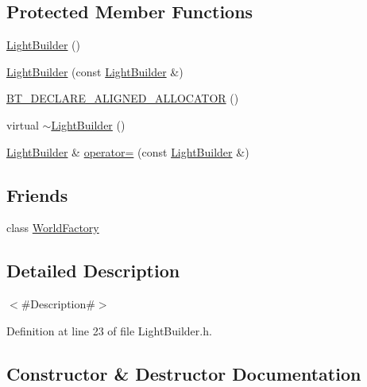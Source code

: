 \subsection*{Protected Member Functions}
\begin{DoxyCompactItemize}
\item 
\mbox{\hyperlink{classnjli_1_1_light_builder_a22fba014290a67469f193aa3ceb70f6b}{Light\+Builder}} ()
\item 
\mbox{\hyperlink{classnjli_1_1_light_builder_a21e8114a3d6b9a5b82f2e779037c51ae}{Light\+Builder}} (const \mbox{\hyperlink{classnjli_1_1_light_builder}{Light\+Builder}} \&)
\item 
\mbox{\hyperlink{classnjli_1_1_light_builder_adb76c72fb81a5069825256062fc50a7a}{B\+T\+\_\+\+D\+E\+C\+L\+A\+R\+E\+\_\+\+A\+L\+I\+G\+N\+E\+D\+\_\+\+A\+L\+L\+O\+C\+A\+T\+OR}} ()
\item 
virtual \mbox{\hyperlink{classnjli_1_1_light_builder_a7d60399cbc33aecd6ad11f63d4efb9c0}{$\sim$\+Light\+Builder}} ()
\item 
\mbox{\hyperlink{classnjli_1_1_light_builder}{Light\+Builder}} \& \mbox{\hyperlink{classnjli_1_1_light_builder_a60818643979ebb467edf749bfac23dec}{operator=}} (const \mbox{\hyperlink{classnjli_1_1_light_builder}{Light\+Builder}} \&)
\end{DoxyCompactItemize}
\subsection*{Friends}
\begin{DoxyCompactItemize}
\item 
class \mbox{\hyperlink{classnjli_1_1_light_builder_acb96ebb09abe8f2a37a915a842babfac}{World\+Factory}}
\end{DoxyCompactItemize}


\subsection{Detailed Description}
$<$\#\+Description\#$>$ 

Definition at line 23 of file Light\+Builder.\+h.



\subsection{Constructor \& Destructor Documentation}
\mbox{\label{classnjli_1_1_light_builder_a22fba014290a67469f193aa3ceb70f6b}} 
